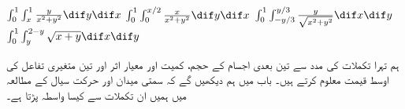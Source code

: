 $\int_0^1\int_x^1\frac{y}{x^2+y^2}\dif y\dif x$
$\int_{0}^{1}\int_{0}^{x/2}\frac{x}{x^2+y^2}\dif y\dif x$
$\int_{0}^{1}\int_{-y/3}^{y/3}\frac{y}{\sqrt{x^2+y^2}}\dif x\dif y$
$\int_{0}^{1}\int_{y}^{2-y}\sqrt{x+y}\dif x\dif y$


ہم تہرا تکملات کی مدد سے تین بعدی اجسام کے حجم، کمیت اور معیار اثر  اور تین متغیری تفاعل کی اوسط قیمت معلوم کرتے ہیں۔  باب  میں ہم دیکھیں گے کہ سمتی میدان   اور  حرکت سیال  کے مطالعہ میں ہمیں ان تکملات سے کیسا واسطہ پڑتا ہے۔

